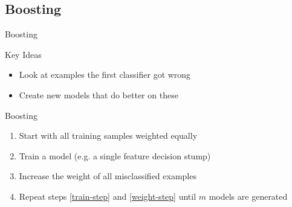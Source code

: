 \documentclass[12pt]{beamer}
\begin{document}
\subsection{Boosting}
\begin{frame}[<+->]{Boosting}
	\begin{block}{Key Ideas}
		\begin{itemize}
			\item Look at examples the first classifier got wrong
			\item Create new models that do better on these
		\end{itemize}
	\end{block}
	\begin{block}{Boosting}
		\begin{enumerate}
			\item Start with all training samples weighted equally
			\item\label{train-step} Train a model (e.g. a single feature \alert{decision stump})
			\item\label{weight-step} Increase the weight of all misclassified examples
			\item Repeat steps \ref{train-step} and \ref{weight-step} until $m$ models are generated
		\end{enumerate}
	\end{block}
\end{frame}
\end{document}
